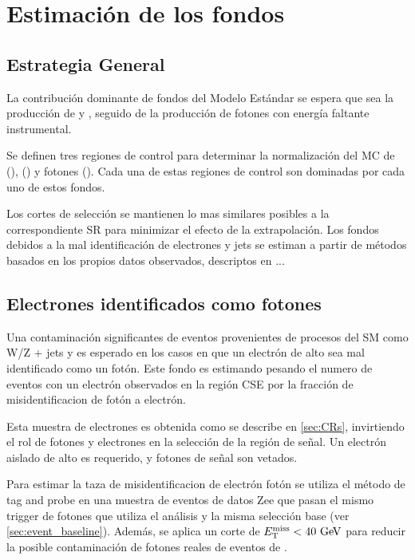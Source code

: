 \chapter{Estimaci\'on de los fondos} \label{cap:fondos}


\section{Estrategia General}

La contribuci\'on dominante de fondos del Modelo Estándar se espera que sea la producción de
{\wgam} y {\ttgam}, seguido de la producción de fotones con energía faltante instrumental.

Se definen tres regiones de control para determinar la normalización del MC de {\wgam} ({\CRW}),
{\ttgam} ({\CRT}) y fotones ({\CRQ}). Cada una de estas regiones de control son dominadas por cada uno
de estos fondos.

Los cortes de selecci\'on se mantienen lo mas similares posibles a la correspondiente SR para
minimizar el efecto de la extrapolaci\'on. Los fondos debidos a la mal identificaci\'on de
electrones y jets se estiman a partir de métodos basados en los propios datos observados,
descriptos en ...

\section{Electrones identificados como fotones} \label{sec:efakes}

Una contaminación significantes de eventos provenientes de procesos del SM
como W/Z + jets y {\tt} es esperado en los casos en que un electrón de alto
{\pt} sea mal identificado como un fotón. Este fondo es estimando pesando
el numero de eventos con un electrón observados en la región CSE por la
fracción de misidentificacion de fotón a electrón.

Esta muestra de electrones es obtenida como se describe en \cref{sec:CRs},
invirtiendo el rol de fotones y electrones en la selección de la región de señal.
Un electrón aislado de alto {\pt}  es requerido, y fotones de señal son vetados.

Para estimar la taza de misidentificacion de electrón fotón se utiliza el método
de tag and probe en una muestra de eventos de datos Zee que pasan el mismo trigger
de fotones que utiliza el análisis y la misma selección base (ver \cref{sec:event_baseline}).
Además, se aplica un corte de $\met  < 40 \gev$ para reducir la posible contaminación de fotones
reales de eventos de {\wgam}.

